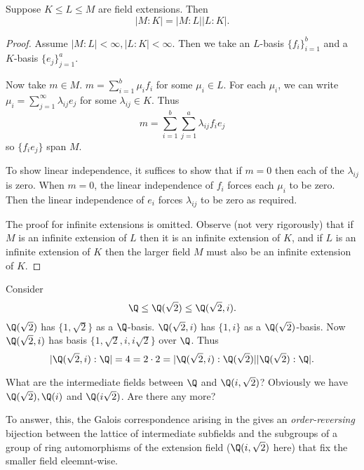 \documentclass[a4paper]{article}
\begin{document}
\begin{theorem}
  \label{thm:tower}
  Suppose \(K \leq L \leq M\) are field extensions. Then
  \[
    |M:K| = |M:L||L:K|.
  \]
\end{theorem}

\begin{proof}
  Assume \(|M:L| < \infty, |L:K| < \infty\). Then we take an \(L\)-basis \(\{f_i\}_{i = 1}^b\) and a \(K\)-basis \(\{e_j\}_{j = 1}^a\).

  Now take \(m \in M\). \(m = \sum_{i = 1}^{b} \mu_if_i\) for some \(\mu_i \in L\). For each \(\mu_i\), we can write \(\mu_i = \sum_{j = 1}^{\infty} \lambda_{ij}e_j\) for some \(\lambda_{ij} \in K\). Thus
  \[
    m = \sum_{i = 1}^{b} \sum_{j = 1}^{a} \lambda_{ij} f_ie_j
  \]
  so \(\{f_ie_j\}\) span \(M\).

  To show linear independence, it suffices to show that if \(m = 0\) then each of the \(\lambda_{ij}\) is zero. When \(m = 0\), the linear independence of \(f_i\) forces each \(\mu_i\) to be zero. Then the linear independence of \(e_i\) forces \(\lambda_{ij}\) to be zero as required.

  The proof for infinite extensions is omitted. Observe (not very rigorously) that if \(M\) is an infinite extension of \(L\) then it is an infinite extension of \(K\), and if \(L\) is an infinite extension of \(K\) then the larger field \(M\) must also be an infinite extension of \(K\).
\end{proof}

\begin{eg}
  Consider
  \[
    \Q \leq \Q(\sqrt 2) \leq \Q(\sqrt 2, i).
  \]
  \(\Q(\sqrt 2)\) has \(\{1, \sqrt 2\}\) as a \(\Q\)-basis. \(\Q(\sqrt 2, i)\) has \(\{1, i\}\) as a \(\Q(\sqrt 2)\)-basis. Now \(\Q(\sqrt 2, i)\) has basis \(\{1, \sqrt 2, i, i \sqrt 2\}\) over \(\Q\). Thus
  \[
    |\Q(\sqrt 2, i):\Q| = 4 = 2 \cdot 2 = |\Q(\sqrt 2, i):\Q(\sqrt 2)||\Q(\sqrt 2):\Q|.
  \]
\end{eg}

What are the intermediate fields between \(\Q\) and \(\Q(i, \sqrt 2)\)? Obviously we have \(\Q(\sqrt 2), \Q(i)\) and \(\Q(i\sqrt 2)\). Are there any more?

To answer, this, the Galois correspondence arising in the  gives an \emph{order-reversing} bijection between the lattice of intermediate subfields and the subgroups of a group of ring automorphisms of the extension field (\(\Q(i, \sqrt 2)\) here) that fix the smaller field eleemnt-wise.
\end{document}
